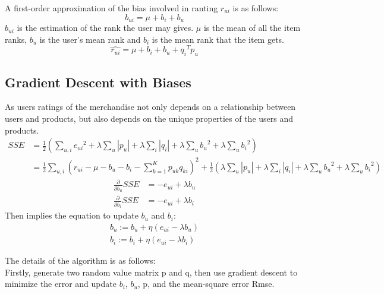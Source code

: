 \documentclass[a4paper, 12pt]{article}
\theoremstyle{definition}
\begin{document}
A first-order approximation of the bias involved in ranting $r_{ui}$ is as follows:
\begin{equation}
b_{ui}=\mu+b_i+b_u
\end{equation}
$b_{ui}$ is the estimation of the rank the user may gives. $\mu$ is the mean of all the item ranks, $b_u$ is the user's mean rank and $b_i$ is the mean rank that the item gets.
\begin{equation}
\hat{r_{ui}}=\mu +b_i+b_u+{q_i}^Tp_{u}
\end{equation}
\subsection{Gradient Descent with Biases}
As users ratings of the merchandise not only depends on a relationship between users and products, but also depends on the unique properties of the users and products.
\begin{equation}
\begin{split}
SSE&=\frac{1}{2}(\sum_{u,i}{e_{ui}}^2+\lambda \sum_{u}|p_u|+\lambda \sum_{i}|q_i|+\lambda \sum_u {b_u}^2+\lambda \sum_u{b_i}^2)\\
&=\frac{1}{2}\sum_{u,i}(r_{ui}-\mu-b_u-b_i-\sum_{k=1}^{K}p_{uk}q_{ki})^2+\frac{1}{2}(\lambda \sum_{u}|p_u|+\lambda \sum_{i}|q_i|+\lambda \sum_u {b_u}^2+\lambda \sum_u{b_i}^2)
\end{split}
\end{equation}
\begin{equation}
\begin{split}
\frac{\partial }{\partial b_{u}}SSE&=-e_{ui}+\lambda b_u \\
\frac{\partial }{\partial b_{i}}SSE&=-e_{ui}+\lambda b_i 
\end{split}
\end{equation}
Then implies the equation to update $b_u$ and $b_i$:
\begin{equation}
\begin{split}
b_u := b_u +\eta(e_{ui}-\lambda b_u)\\
b_i := b_i +\eta(e_{ui}-\lambda b_i)
\end{split}
\end{equation}


The details of the algorithm is as follows:\\


Firstly, generate two random value matrix p and q, then use gradient descent to minimize the error and update $b_i$, $b_u$, p, and the mean-square error Rmse.\\
\end{document}
